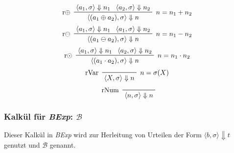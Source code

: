 				\begin{multicols}{2}
					\begin{equation*}
						\prftree[l, r]
						{ $ n = n _ 1 + n _ 2 $ }
						{ r$ \oplus $ }
						{ \langle a _ 1, \sigma \rangle \Downarrow n _ 1 }
						{ \langle a _ 2, \sigma \rangle \Downarrow n _ 2 }
						{ \langle (a _ 1 \oplus a _ 2), \sigma \rangle \Downarrow n }
					\end{equation*}
					\begin{equation*}
						\prftree[l, r]
						{ $ n = n _ 1 - n _ 2 $ }
						{ r$ \ominus $ }
						{ \langle a _ 1, \sigma \rangle \Downarrow n _ 1 }
						{ \langle a _ 1, \sigma \rangle \Downarrow n _ 2 }
						{ \langle (a _ 1 \ominus a _ 2), \sigma \rangle \Downarrow n }
					\end{equation*}
					\begin{equation*}
						\prftree[l, r]
						{ $ n = n _ 1 \cdot n _ 2 $ }
						{ r$ \odot $ }
						{ \langle a _ 1, \sigma \rangle \Downarrow n _ 1 }
						{ \langle a _ 2, \sigma \rangle \Downarrow n _ 2 }
						{ \langle (a _ 1 \cdot a _ 2), \sigma \rangle \Downarrow n }
					\end{equation*}
					\begin{equation*}
						\prftree[l, r]
						{ $ n  = \sigma(X) $ }
						{ rVar }
						{ \langle X, \sigma \rangle \Downarrow n }
					\end{equation*}
					\begin{equation*}
						\prftree[l]
						{ rNum }
						{ \langle n, \sigma \rangle \Downarrow n }
					\end{equation*}
				\end{multicols}

			\subsubsection{Kalkül für \textit{BExp}: $ \mathcal{B} $}
				Dieser Kalkül in \textit{BExp} wird zur Herleitung von Urteilen der Form $ \langle b, \sigma \rangle \Downarrow t $ genutzt und $ \mathcal{B} $ genannt.

